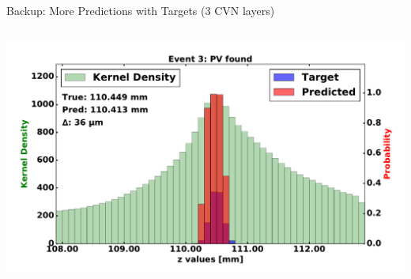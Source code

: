 \begin{frame}{Backup: More Predictions with Targets (3 CVN layers)}
\begin{columns}[c]
\begin{center}
           \includegraphics[width=1\textwidth, height=0.45\textwidth, trim=18 0 18 0]{images/120000_3layer_19.pdf}
       \end{center}
  \end{columns}
\end{frame}

